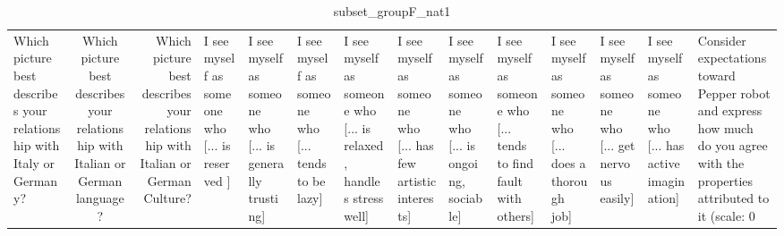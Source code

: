 \begin{table}
\caption{subset_groupF_nat1}
\label{tab:subset_groupF_nat1}
\begin{tabular}{lcr}
\toprule
Which picture best describes your relationship with Italy or Germany? & Which picture best describes your relationship with Italian or German language? & Which picture best describes your relationship with Italian or German Culture? & I see myself as someone who  [... is reserved ] & I see myself as someone who  [... is generally trusting] & I see myself as someone who  [... tends to be lazy] & I see myself as someone who  [... is relaxed, handles stress well] & I see myself as someone who  [... has few artistic interests] & I see myself as someone who  [... is ongoing, sociable] & I see myself as someone who  [... tends to find fault with others] & I see myself as someone who  [... does a thorough job] & I see myself as someone who  [... get nervous easily] & I see myself as someone who  [... has active imagination] & Consider expectations toward Pepper robot and express how much do you agree with the properties attributed to it (scale: 0%
\end{tabular}
\end{table}
